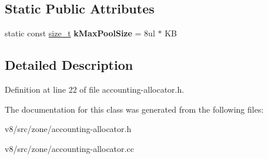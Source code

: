 \subsection*{Static Public Attributes}
\begin{DoxyCompactItemize}
\item 
\mbox{\label{classv8_1_1internal_1_1AccountingAllocator_a736911edc7ff18dc7215b9a5bb5fda9c}} 
static const \mbox{\hyperlink{classsize__t}{size\+\_\+t}} {\bfseries k\+Max\+Pool\+Size} = 8ul $\ast$ KB
\end{DoxyCompactItemize}


\subsection{Detailed Description}


Definition at line 22 of file accounting-\/allocator.\+h.



The documentation for this class was generated from the following files\+:\begin{DoxyCompactItemize}
\item 
v8/src/zone/accounting-\/allocator.\+h\item 
v8/src/zone/accounting-\/allocator.\+cc\end{DoxyCompactItemize}

